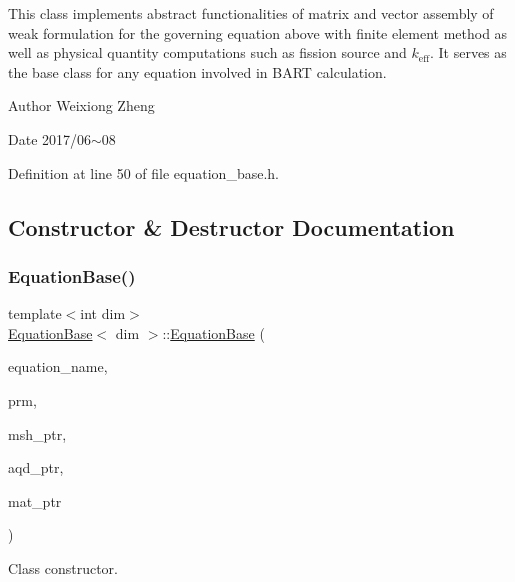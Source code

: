 This class implements abstract functionalities of matrix and vector assembly of weak formulation for the governing equation above with finite element method as well as physical quantity computations such as fission source and $k_\mathrm{eff}$. It serves as the base class for any equation involved in B\+A\+RT calculation.

\begin{DoxyAuthor}{Author}
Weixiong Zheng 
\end{DoxyAuthor}
\begin{DoxyDate}{Date}
2017/06$\sim$08 
\end{DoxyDate}


Definition at line 50 of file equation\+\_\+base.\+h.



\subsection{Constructor \& Destructor Documentation}
\mbox{\label{class_equation_base_a1e027696da2ab5a030daa34bf99430fe}} 
\subsubsection{\texorpdfstring{Equation\+Base()}{EquationBase()}}
{\footnotesize\ttfamily template$<$int dim$>$ \\
\hyperlink{class_equation_base}{Equation\+Base}$<$ dim $>$\+::\hyperlink{class_equation_base}{Equation\+Base} (\begin{DoxyParamCaption}\item[{std\+::string}]{equation\+\_\+name,  }\item[{const Parameter\+Handler \&}]{prm,  }\item[{const std\+\_\+cxx11\+::shared\+\_\+ptr$<$ \hyperlink{class_mesh_generator}{Mesh\+Generator}$<$ dim $>$ $>$}]{msh\+\_\+ptr,  }\item[{const std\+\_\+cxx11\+::shared\+\_\+ptr$<$ \hyperlink{class_a_q_base}{A\+Q\+Base}$<$ dim $>$ $>$}]{aqd\+\_\+ptr,  }\item[{const std\+\_\+cxx11\+::shared\+\_\+ptr$<$ \hyperlink{class_material_properties}{Material\+Properties} $>$}]{mat\+\_\+ptr }\end{DoxyParamCaption})}

Class constructor.


